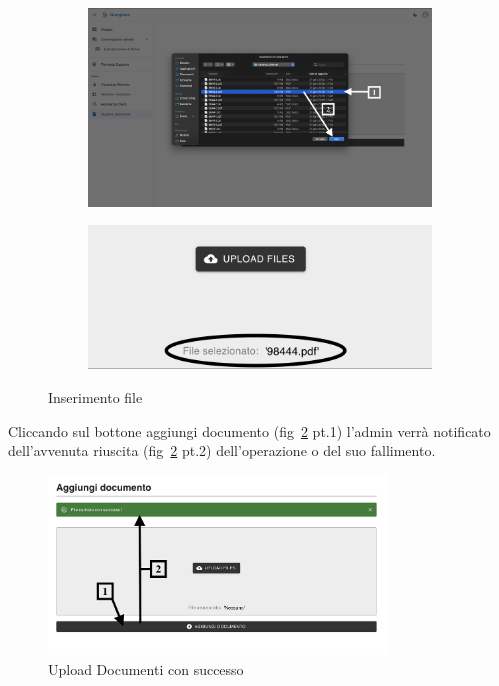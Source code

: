 \begin{figure}[h!]
    \centering
    \begin{subfigure}{0.4\textwidth}
        \centering
        \includegraphics[width=\textwidth]{./img/PaginaGestioneDocumenti3.png}
    \end{subfigure}
    \hspace{0.05\textwidth}
    \begin{subfigure}{0.4\textwidth}
        \centering
        \includegraphics[width=\textwidth]{./img/GestioneDocumenti4.png}
    \end{subfigure}
    \caption{Inserimento file}
    \label{fig:gestione3}
\end{figure}
Cliccando sul bottone aggiungi documento (fig~\ref{fig:gestione4} pt.1) l'admin verrà notificato dell'avvenuta riuscita (fig~\ref{fig:gestione4} pt.2) dell'operazione o del suo fallimento.
\begin{figure}[h!]
    \centering
    \includegraphics[width=0.8\textwidth]{./img/GestioneDocumenti5.png}
    \caption{Upload Documenti con successo}
    \label{fig:gestione4}
\end{figure}